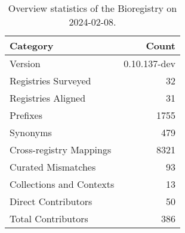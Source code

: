 \begin{table}
\caption{Overview statistics of the Bioregistry on 2024-02-08.}
\label{tab:bioregistry-summary}
\begin{tabular}{lr}
\toprule
Category & Count \\
\midrule
Version & 0.10.137-dev \\
Registries Surveyed & 32 \\
Registries Aligned & 31 \\
Prefixes & 1755 \\
Synonyms & 479 \\
Cross-registry Mappings & 8321 \\
Curated Mismatches & 93 \\
Collections and Contexts & 13 \\
Direct Contributors & 50 \\
Total Contributors & 386 \\
\bottomrule
\end{tabular}
\end{table}
